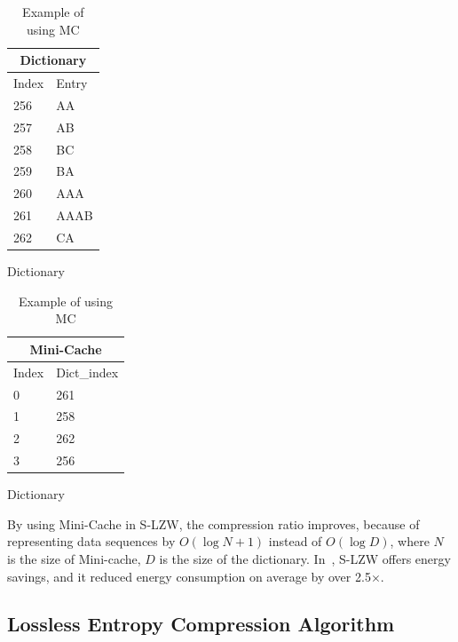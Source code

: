 \begin{table}[]
    \begin{minipage}{.45\textwidth}
        \centering
        \begin{tabular}{|l|l|}
        \hline
        \multicolumn{2}{c}{Dictionary}  \\ \hline
        Index           & Entry         \\ \hline
        256             & AA            \\ 
        257             & AB            \\ 
        258             & BC            \\ 
        259             & BA            \\
        260             & AAA           \\
        261             & AAAB          \\
        262             & CA            \\
        \hline
        \end{tabular}
    \caption{Dictionary}
    \end{minipage}
    \hfill
    \begin{minipage}{.45\textwidth}
        \centering
        \begin{tabular}{|l|l|}
        \hline
        \multicolumn{2}{c}{Mini-Cache}  \\ \hline
        Index        & Dict\_index      \\ \hline
        0            & 261              \\
        1            & 258              \\
        2            & 262              \\
        3            & 256              \\
        \hline
        \end{tabular}
    \caption{Dictionary}
    \end{minipage}
   
    \caption{Example of using MC}
    \label{table:MC}
\end{table}

By using Mini-Cache in S-LZW, the compression ratio improves, because of
representing data sequences by $O(\log N + 1)$ instead of $O(\log D)$,
where $N$ is the size of Mini-cache, $D$ is the size of the dictionary.
In~\cite{sadler2006data}, S-LZW offers energy savings, and it reduced
energy consumption on average by over 2.5$\times$.


\subsection{Lossless Entropy Compression Algorithm}

